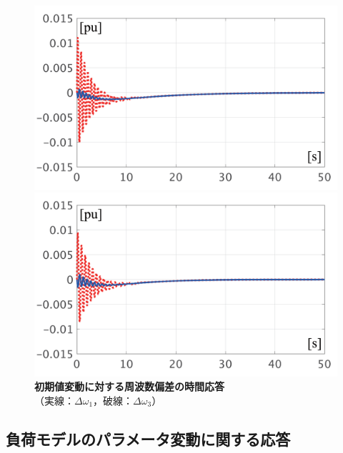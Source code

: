 \documentclass[tombow,dvipdfmx]{corona-a5-1.1}
\begin{document}
\begin{figure}[t]
  \centering
  {
  \begin{minipage}{0.49\linewidth}
    \centering
    \includegraphics[width = 1.0\linewidth]{figs/P1ini}
  \end{minipage}
  \begin{minipage}{0.49\linewidth}
    \centering
    \includegraphics[width = 1.0\linewidth]{figs/P3ini}
  \end{minipage}
  \medskip
  \caption{\textbf{初期値変動に対する周波数偏差の時間応答}
  \\ \centering（実線：$\Delta \omega_1$，破線：$\Delta \omega_3$）}
  \label{fig:P13ini}
  }
\medskip
\end{figure}

\subsection{負荷モデルのパラメータ変動に関する応答}\label{sec:resldpara}
\end{document}
